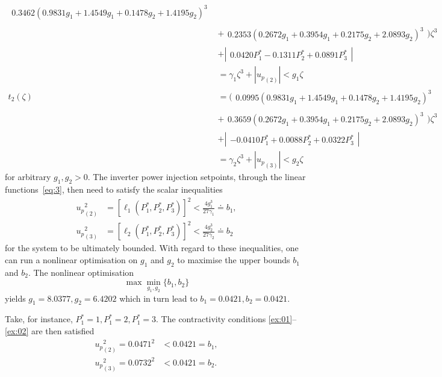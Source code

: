 \documentclass[letter, 10pt, conference]{ieeeconf}
\newcommand{\1}{\mathbf{1}}
\newcommand{\0}{\mathbf{0}}
\begin{document}
{\begin{align*}
\begin{smallmatrix}
			0.3462(0.9831 g_1 + 1.4549 g_1 + 0.1478 g_2 + 1.4195 g_2)^3 
	   \end{smallmatrix} \\
	 &+\begin{smallmatrix}
	 		0.2353(0.2672 g_1 + 0.3954 g_1 + 0.2175 g_2 + 2.0893 g_2)^3 
	   \end{smallmatrix} 
	  ) \zeta^3 \\
	 &+\left|\begin{smallmatrix}
		 0.0420 P_1^* - 0.1311 P_2^* + 0.0891 P_3^*
	\end{smallmatrix}\right| \\
	&= \gamma_1 \zeta^3 + |{u_p}_{(2)}| < g_1 \zeta
	\\
	t_2(\zeta)
	&=( 
	   \begin{smallmatrix} 
			0.0995(0.9831 g_1 + 1.4549 g_1 + 0.1478 g_2 + 1.4195 g_2)^3 
	   \end{smallmatrix} \\
	 &+\begin{smallmatrix}
	 		0.3659(0.2672 g_1 + 0.3954 g_1 + 0.2175 g_2 + 2.0893 g_2)^3 
	   \end{smallmatrix} 
	  ) \zeta^3 \\
	 &+\left|\begin{smallmatrix}
		-0.0410 P_1^* + 0.0088 P_2^* + 0.0322 P_3^*
	\end{smallmatrix}\right| \\
	&= \gamma_2 \zeta^3 + |{u_p}_{(3)}| < g_2 \zeta
\end{align*}
for arbitrary $g_1,g_2>0$.
The inverter power injection setpoints, through the linear
functions~\eqref{eq:3}, then need to satisfy the scalar inequalities
\begin{align}
	\label{ex:01}
  {u_p}_{(2)}^2 & =[\ell_1(P_1^*,P_2^*,P_3^*)]^2< \frac{4 g_1^3}{27 \gamma_1}
  	\doteq b_1,\\
  	\label{ex:02}
  {u_p}_{(3)}^2 &= [\ell_2(P_1^*,P_2^*,P_3^*)]^2 < \frac{4 g_2^3}{27\gamma_2}
    \doteq b_2
\end{align}
for the system to be ultimately bounded.  With regard to these
inequalities, one can run a nonlinear optimisation on $g_1$ and $g_2$
to maximise the upper bounds $b_1$ and $b_2$.  The nonlinear
optimisation
\begin{equation*}
	\max \min_{g_1,g_2} \{b_1,b_2\}
\end{equation*}
yields $g_1=8.0377, g_2=6.4202$ which in turn lead to
$ b_1=0.0421, b_2=0.0421$.

Take, for instance, $P_1^*=1,P_1^*=2,P_1^*=3$. The contractivity conditions
\eqref{ex:01}--\eqref{ex:02} are then satisfied
\begin{align*}
  {u_p}_{(2)}^2 = 0.0471^2 &< 0.0421=b_1,\\
  {u_p}_{(3)}^2 = 0.0732^2 &< 0.0421=b_2.
\end{align*}

}
\end{document}
